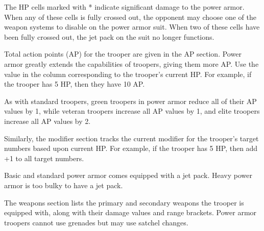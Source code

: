 The HP cells marked with * indicate significant damage to the power armor.
When any of these cells is fully crossed out, the opponent may choose one of the weapon systems to disable on the power armor suit.
When two of these cells have been fully crossed out, the jet pack on the suit no longer functions.

Total action points (AP) for the trooper are given in the AP section.
Power armor greatly extends the capabilities of troopers, giving them more AP.
Use the value in the column corresponding to the trooper's current HP.
For example, if the trooper has 5 HP, then they have 10 AP.

As with standard troopers, green troopers in power armor reduce all of their AP values by 1, while veteran troopers increase all AP values by 1, and elite troopers increase all AP values by 2.

Similarly, the modifier section tracks the current modifier for the trooper's target numbers based upon current HP.
For example, if the trooper has 5 HP, then add +1 to all target numbers.

Basic and standard power armor comes equipped with a jet pack.
Heavy power armor is too bulky to have a jet pack.

The weapons section lists the primary and secondary weapons the trooper is equipped with, along with their damage values and range brackets.
Power armor troopers cannot use grenades but may use satchel changes.
